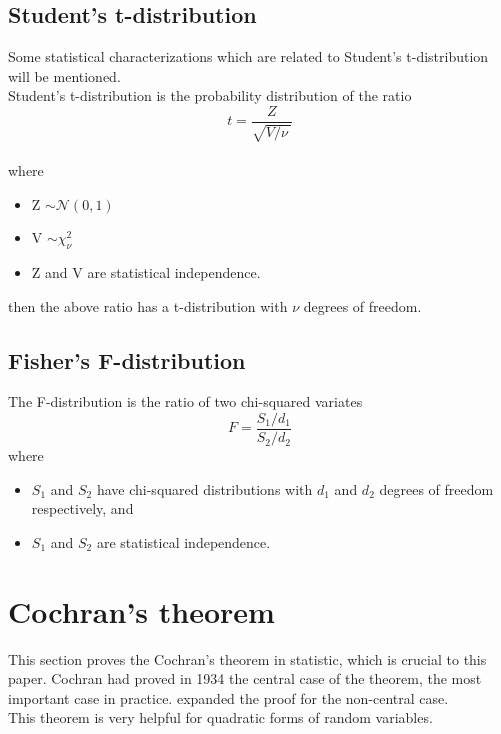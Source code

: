 \subsection{Student's t-distribution}
Some statistical characterizations which are related to Student's t-distribution will be mentioned.\\
Student's t-distribution is the probability distribution of the ratio
\begin{equation} \label{eq:t-dist}
	t = \frac{Z}{\sqrt{V/\nu\ }}
\end{equation}
\\
where
\begin{itemize}
 	\item Z $ \sim \mathcal {N}(0,1) $
	\item V $ \sim\chi^2_{\nu} $
 	\item Z and V are statistical independence.
\end{itemize}
then the above ratio has a t-distribution with $\nu$ degrees of freedom.
\subsection{Fisher's F-distribution}
The F-distribution is the ratio of two chi-squared variates
\begin{equation} \label{eq:f-dist}
	F = \frac{S_1 / d_1}{S_2 / d_2}
\end{equation}
where
\begin{itemize}
 	\item $S_1$ and $S_2$ have chi-squared distributions with $d_1$ and $d_2$ degrees of freedom respectively, and
 	\item $S_1$ and $S_2$ are statistical independence.
\end{itemize}
\section {Cochran's theorem} \label{appendixb}
This section proves the Cochran's theorem in statistic, which is crucial to this paper. Cochran had proved in 1934 the central case of the theorem, the most important case in practice. \cite{madow} expanded the proof for the non-central case. \\
This theorem is very helpful for quadratic forms of random variables. 
\\
\theoremstyle{definition} \newtheorem*{mytheo}{Cochran's theorem}


